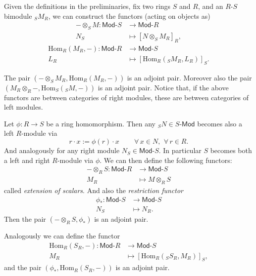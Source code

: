 \begin{rem}[]
	Given the definitions in the preliminaries, fix two rings $S$ and $R$, and an $R$-$S$ bimodule ${}_SM_R$,
	we can construct the functors (acting on objects as)
	\begin{align}
		- \otimes_S M: \mathsf{Mod}\text{-}S &\to \mathsf{Mod}\text{-}R \\
		 N_S &\mapsto \left[ N \otimes_S M_R \right]_R
	,\end{align}
	\begin{align}
		\mathrm{Hom}_{R} \left( M_R, - \right): \mathsf{Mod}\text{-}R &\to \mathsf{Mod}\text{-}S \\
		L_R &\mapsto \left[ \mathrm{Hom}_{R}\left( {}_SM_R, L_R \right)\right]_S
	.\end{align} 	
\end{rem}

\begin{prop}
	The pair $\left(- \otimes_S M_R, \mathrm{Hom}_{R}\left( M_R, - \right)\right)$
	is an adjoint pair.
	Moreover also the pair $\left(M_R \otimes_R -, 
	\mathrm{Hom}_{S}\left( {}_SM, - \right) \right)$ is an adjoint pair.
	Notice that, if the above functors are between categories of right modules,
	these are between categories of left modules.
\end{prop} 

\begin{ex}
	Let $\phi: R \to S$ be a ring homomorphism.
	Then any ${}_SN \in S\text{-}\mathsf{Mod}$ becomes also a left $R$-module via
	\begin{equation}
		r \cdot x := \phi(r) \cdot x \qquad \,\forall\, x \in N,\ \,\forall\, r \in R
	.\end{equation} 
	And analogously for any right module $N_S \in \mathsf{Mod}\text{-}S$.
	In particular $S$ becomes both a left and right $R$-module via $\phi$.
	We can then define the following functors:
	\begin{align}
		-\otimes_R S: \mathsf{Mod}\text{-}R &\to \mathsf{Mod}\text{-}S \\
		M_R &\mapsto M \otimes_R S
	\end{align} 
	called {\em extension of scalars}.
	And also the {\em restriction functor}
	\begin{align}
		\phi_*: \mathsf{Mod}\text{-}S &\to \mathsf{Mod}\text{-}S \\
		N_S &\mapsto N_R
	.\end{align} 
	Then the pair $\left(- \otimes_R S, \phi_*\right)$ is an adjoint pair.

	Analogously we can define the functor
	\begin{align}
		\mathrm{Hom}_{ R}\left( S_R, - \right): \mathsf{Mod}\text{-}R &\to \mathsf{Mod}\text{-}S\\
		M_R &\mapsto \left[ \mathrm{Hom}_{R}\left({}_SS_R, M_R \right) \right]_S
	,\end{align} 
	and the pair $\left(\phi_*, \mathrm{Hom}_{ R}\left( S_R, - \right)\right)$ is an adjoint pair.
\end{ex} 	

